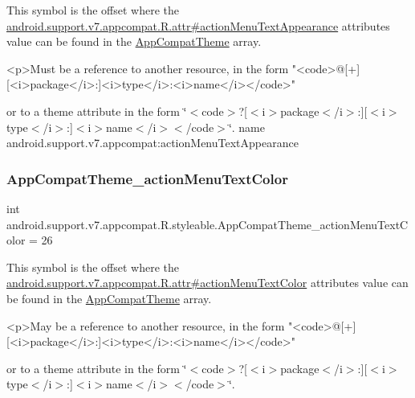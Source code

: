 This symbol is the offset where the \hyperlink{classandroid_1_1support_1_1v7_1_1appcompat_1_1R_1_1attr_a471d001a1c418b85dcaf54b0d910b842}{android.\+support.\+v7.\+appcompat.\+R.\+attr\#action\+Menu\+Text\+Appearance} attribute\textquotesingle{}s value can be found in the \hyperlink{classandroid_1_1support_1_1v7_1_1appcompat_1_1R_1_1styleable_a5c42f89e8a410c323be34208d75c430b}{App\+Compat\+Theme} array.

\begin{DoxyVerb}      <p>Must be a reference to another resource, in the form "<code>@[+][<i>package</i>:]<i>type</i>:<i>name</i></code>"
\end{DoxyVerb}
 or to a theme attribute in the form \char`\"{}$<$code$>$?\mbox{[}$<$i$>$package$<$/i$>$\+:\mbox{]}\mbox{[}$<$i$>$type$<$/i$>$\+:\mbox{]}$<$i$>$name$<$/i$>$$<$/code$>$\char`\"{}.  name android.\+support.\+v7.\+appcompat\+:action\+Menu\+Text\+Appearance \mbox{\label{classandroid_1_1support_1_1v7_1_1appcompat_1_1R_1_1styleable_a7d660534f3eac2be993592cc73cf7d82}} 
\subsubsection{\texorpdfstring{App\+Compat\+Theme\+\_\+action\+Menu\+Text\+Color}{AppCompatTheme\_actionMenuTextColor}}
{\footnotesize\ttfamily int android.\+support.\+v7.\+appcompat.\+R.\+styleable.\+App\+Compat\+Theme\+\_\+action\+Menu\+Text\+Color = 26\hspace{0.3cm}{\ttfamily [static]}}

This symbol is the offset where the \hyperlink{classandroid_1_1support_1_1v7_1_1appcompat_1_1R_1_1attr_a9ac5cc329fd14ece75b0ee49b520bbb5}{android.\+support.\+v7.\+appcompat.\+R.\+attr\#action\+Menu\+Text\+Color} attribute\textquotesingle{}s value can be found in the \hyperlink{classandroid_1_1support_1_1v7_1_1appcompat_1_1R_1_1styleable_a5c42f89e8a410c323be34208d75c430b}{App\+Compat\+Theme} array.

\begin{DoxyVerb}      <p>May be a reference to another resource, in the form "<code>@[+][<i>package</i>:]<i>type</i>:<i>name</i></code>"
\end{DoxyVerb}
 or to a theme attribute in the form \char`\"{}$<$code$>$?\mbox{[}$<$i$>$package$<$/i$>$\+:\mbox{]}\mbox{[}$<$i$>$type$<$/i$>$\+:\mbox{]}$<$i$>$name$<$/i$>$$<$/code$>$\char`\"{}. 

